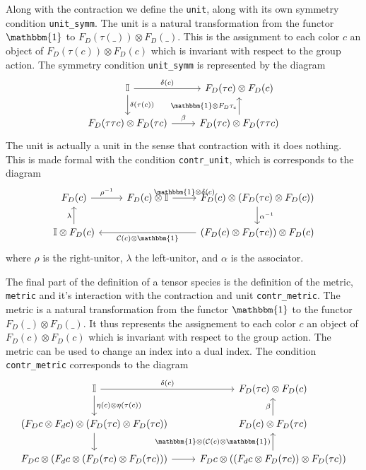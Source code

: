 \documentclass[a4paper, 11pt]{article}
\begin{document}
Along with the contraction we define the \lstinline|unit|, along with its own symmetry condition 
\lstinline|unit_symm|. The unit is a natural transformation from the functor  $\mathbbm{1}$ to 
$F_D(\tau(\_)) \otimes F_D (\_)$. This is the assignment to each color $c$ an object of 
$F_D(\tau(c)) \otimes F_D (c)$ which is invariant with respect to the group action. 
The symmetry condition \lstinline|unit_symm| is represented by the diagram 
\begin{equation} 
  \begin{tikzcd}
    \mathbb{I} \arrow[r, "{\delta(c)}"] \arrow[d, "{\delta(\tau(c))}"] & F_D(\tau c) \otimes F_D(c) \\
    F_D(\tau \tau c) \otimes F_D(\tau c) \arrow[r, "{\beta}"] & F_D(\tau c) \otimes F_D(\tau \tau c) \arrow[u, "{\mathbbm{1} \otimes F_D \tau_c}"]
  \end{tikzcd}
\end{equation} 
The unit is actually a unit in the sense that contraction with it does nothing. This is made formal with the condition 
\lstinline|contr_unit|, which is corresponds to the diagram 
\begin{equation}
  \begin{tikzcd}
    F_D(c) \arrow[r, "{\rho^{-1}}"] &  F_D(c) \otimes \mathbb{I} \arrow[r, "{\mathbbm{1}\otimes \delta(c)}"] & F_D(c) \otimes (F_D (\tau c) \otimes F_D(c)) \arrow[d, "{\alpha^{-1}}"] \\
    \mathbb{I} \otimes F_D(c) \arrow[u, "{\lambda}"] &   &(F_D(c) \otimes F_D(\tau c)) \otimes F_D(c) \arrow[ll, "{\mathcal{C}(c)\otimes \mathbbm{1}}"] 
\end{tikzcd}
\end{equation}
where $\rho$ is the right-unitor, $\lambda$ the left-unitor, and $\alpha$ is the associator. 

The final part of the definition of a tensor species is the definition of the metric, \lstinline|metric| 
and it's interaction with the contraction and unit \lstinline|contr_metric|. 
The metric is a natural transformation from the functor $\mathbbm{1}$
to the functor $F_D(\_) \otimes F_D (\_)$. It thus represents the assignement to each color $c$ an object of
$F_D(c) \otimes F_D (c)$ which is invariant with respect to the group action.
The metric can be used to change an index into a dual index. The condition \lstinline|contr_metric|
corresponds to the diagram 
\begin{equation}
  \begin{tikzcd}
    \mathbb{I} \arrow[r, "{\delta(c)}"] \arrow[d, "{\eta(c)\otimes \eta(\tau(c))}"] & F_D(\tau c) \otimes F_D (c) \\ 
    (F_D c \otimes F_d c) \otimes (F_D (\tau c) \otimes F_D (\tau c) ) \arrow [d]  & F_D (c) \otimes F_D(\tau c) \arrow[u, "{\beta}"] \\ 
    F_D c \otimes (F_d c \otimes (F_D (\tau c) \otimes F_D (\tau c) )) \arrow [r] &  F_D c \otimes ((F_d c \otimes F_D (\tau c)) \otimes F_D (\tau c) ) \arrow[u, "{\mathbbm{1} \otimes(\mathcal{C}(c) \otimes \mathbbm{1})}"]
  \end{tikzcd}
\end{equation}
\end{document}

